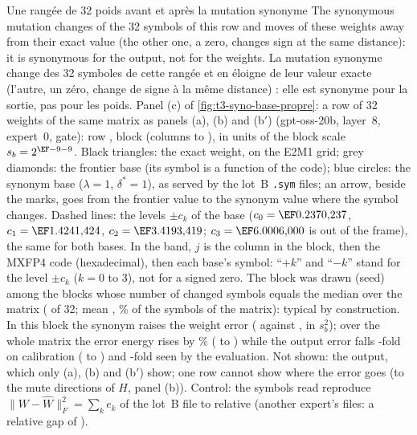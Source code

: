 %
{Une rangée de 32 poids avant et après la mutation synonyme}
%
{The synonymous mutation changes \LatRangChanges{} of the 32 symbols of this row and moves \LatRangEloignes{} of
these weights away from their exact value (the other one, a zero, changes sign at the same distance): it is
synonymous for the output, not for the weights.}%
{La mutation synonyme change \LatRangChanges{} des 32 symboles de cette rangée et en éloigne \LatRangEloignes{}
de leur valeur exacte (l'autre, un zéro, change de signe à la même distance) : elle est synonyme pour la sortie,
pas pour les poids.}%
{Panel (c) of \cref{fig:t3-syno-base-propre}: a row of 32 weights of the same matrix as panels (a), (b) and (b$'$) (gpt-oss-20b, layer~8,
expert~0, gate): row \LatRangLigne, block \LatRangBloc{} (columns \LatRangColA{} to \LatRangColB), in units of the
block scale $s_b=2^{\LatRangExpoRel}$. Black triangles: the exact weight, on the E2M1 grid; grey diamonds: the
frontier base (its symbol is a function of the code); blue circles: the synonym base ($\lambda=1$, $\delta^\ast=1$),
as served by the lot~B \texttt{.sym} files; an arrow, beside the marks, goes from the frontier value to the synonym value where the
symbol changes. Dashed lines: the levels $\pm c_k$ of the base ($c_0=\LatCentreUn$, $c_1=\LatCentreDeux$,
$c_2=\LatCentreTrois$; $c_3=\LatCentreQuatre$ is out of the frame), the same for both bases. In the band, $j$ is the
column in the block, then the MXFP4 code (hexadecimal), then each base's symbol: ``$+k$'' and ``$-k$'' stand for the
level $\pm c_k$ ($k=0$ to $3$), not for a signed zero. The block was drawn (seed) among the \LatRangCandidats{} blocks
whose number of changed symbols equals the median over the matrix (\LatRangMediane{} of 32; mean \LatRangMoyenne,
\LatRangPartMatrice\% of the symbols of the matrix): typical by construction. In this block the synonym raises the
weight error (\LatRangErrS{} against \LatRangErrF, in $s_b^2$); over the whole matrix the error energy rises by
\LatSpecEnergieHausse\% (\LatSpecEnergieF{} to \LatSpecEnergieS) while the output error falls
\LatSpecCalibRapport-fold on calibration (\LatSpecCalibF{} to \LatSpecCalibS) and \LatSpecEvalRapport-fold seen by
the evaluation. Not shown: the output, which only (a), (b) and (b$'$) show; one row cannot show where the error goes (to the
mute directions of $H$, panel (b)). Control: the symbols read reproduce $\lVert W-\hat W\rVert_F^2=\sum_k e_k$ of the
lot~B file to \LatRangTemoin{} relative (another expert's files: a relative gap of \LatRangCassure).}%

